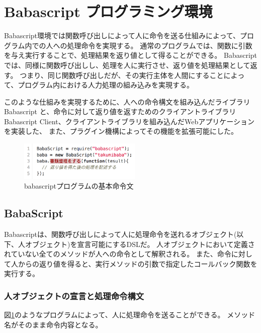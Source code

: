 \section{Babascript
プログラミング環境}\label{babascript-ux30d7ux30edux30b0ux30e9ux30dfux30f3ux30b0ux74b0ux5883}

Babascript環境では関数呼び出しによって人に命令を送る仕組みによって、プログラム内での人への処理命令を実現する。
通常のプログラムでは、関数に引数を与え実行することで、処理結果を返り値として得ることができる。
Babascriptでは、同様に関数呼び出しし、処理を人に実行させ、返り値を処理結果として返す。
つまり、同じ関数呼び出しだが、その実行主体を人間にすることによって、プログラム内における人力処理の組み込みを実現する。

このような仕組みを実現するために、人への命令構文を組み込んだライブラリ
Babascript と、命令に対して返り値を返すためのクライアントライブラリ
Babascript
Client、クライアントライブラリを組み込んだWebアプリケーションを実装した、
また、プラグイン機構によってその機能を拡張可能にした。

\begin{figure}[h]
  \centering
  \includegraphics[width=220px]{./images/script_01.png}
  \caption{babascriptプログラムの基本命令文}
  \label{script_01}
\end{figure}

\subsection{BabaScript}\label{babascript}

Babascriptは、関数呼び出しによって人に処理命令を送れるオブジェクト(以下、人オブジェクト)を宣言可能にするDSLだ。
人オブジェクトにおいて定義されていない全てのメソッドが人への命令として解釈される。
また、命令に対して人からの返り値を得ると、実行メソッドの引数で指定したコールバック関数を実行する。

\subsubsection{人オブジェクトの宣言と処理命令構文}\label{ux4ebaux30aaux30d6ux30b8ux30a7ux30afux30c8ux306eux5ba3ux8a00ux3068ux51e6ux7406ux547dux4ee4ux69cbux6587}

図\ref{script_01}のようなプログラムによって、人に処理命令を送ることができる。
メソッド名がそのまま命令内容となる。

